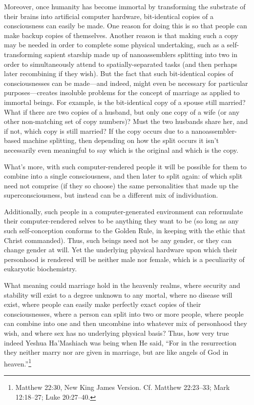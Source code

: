 \documentclass[letterpaper,12pt]{article}
\begin{document}
Moreover, once humanity has become immortal by transforming the substrate of their brains into artificial computer hardware, bit-identical copies of a consciousness can easily be made. One reason for doing this is so that people can make backup copies of themselves. Another reason is that making such a copy may be needed in order to complete some physical undertaking, such as a self-transforming sapient starship made up of nanoassemblers splitting into two in order to simultaneously attend to spatially-separated tasks (and then perhaps later recombining if they wish). But the fact that such bit-identical copies of consciousnesses can be made---and indeed, might even be necessary for particular purposes---creates insoluble problems for the concept of marriage as applied to immortal beings. For example, is the bit-identical copy of a spouse still married? What if there are two copies of a husband, but only one copy of a wife (or any other non-matching set of copy numbers)? Must the two husbands share her, and if not, which copy is still married? If the copy occurs due to a nanoassembler-based machine splitting, then depending on how the split occurs it isn't necessarily even meaningful to say which is the original and which is the copy.

What's more, with such computer-rendered people it will be possible for them to combine into a single consciousness, and then later to split again: of which split need not comprise (if they so choose) the same personalities that made up the superconsciousness, but instead can be a different mix of individuation.

Additionally, such people in a computer-generated environment can reformulate their computer-rendered selves to be anything they want to be (so long as any such self-conception conforms to the Golden Rule, in keeping with the ethic that Christ commanded). Thus, such beings need not be any gender, or they can change gender at will. Yet the underlying physical hardware upon which their personhood is rendered will be neither male nor female, which is a peculiarity of eukaryotic biochemistry.

What meaning could marriage hold in the heavenly realms, where security and stability will exist to a degree unknown to any mortal, where no disease will exist, where people can easily make perfectly exact copies of their consciousnesses, where a person can split into two or more people, where people can combine into one and then uncombine into whatever mix of personhood they wish, and where sex has no underlying physical basis? Thus, how very true indeed Yeshua Ha'Mashiach was being when He said, ``For in the resurrection they neither marry nor are given in marriage, but are like angels of God in heaven.''\footnote{Matthew 22:30, New King James Version. Cf. Matthew 22:23--33; Mark 12:18--27; Luke 20:27--40.}
\end{document}
